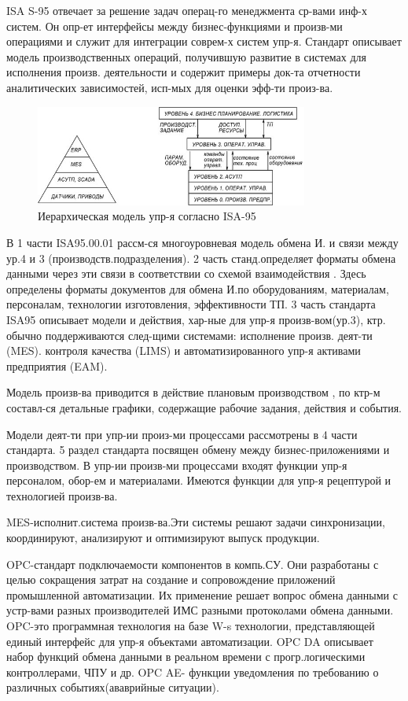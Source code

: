 \documentclass[unicode, 12pt, a4paper, oneside]{article}
\begin{document}
ISA S-95 отвечает за решение задач операц-го менеджмента ср-вами инф-х систем. Он опр-ет интерфейсы между бизнес-функциями и произв-ми операциями и служит для интеграции соврем-х систем упр-я. Стандарт описывает модель производственных операций, получившую развитие в системах для исполнения произв. деятельности и содержит примеры док-та отчетности аналитических зависимостей, исп-мых для оценки эфф-ти произ-ва.
\begin{figure}[H]
\centering
\includegraphics[width=0.8\textwidth]{47_Urovni.jpg}
\caption{Иерархическая модель упр-я согласно ISA-95}
\end{figure}

В 1 части ISA95.00.01 рассм-ся многоуровневая модель обмена И. и связи между ур.4 и 3 (производств.подразделения). 2 часть станд.определяет форматы обмена данными через эти связи в соответствии со схемой взаимодействия . Здесь определены форматы документов для обмена И.по оборудованиям, материалам, персоналам, технологии изготовления, эффективности ТП. 3 часть стандарта ISA95 описывает модели и действия, хар-ные для упр-я произв-вом(ур.3), ктр. обычно поддерживаются след-щими системами: исполнение произв. деят-ти (MES). контроля качества (LIMS) и автоматизированного упр-я активами предприятия (EAM).

Модель произв-ва приводится в действие плановым производством , по ктр-м составл-ся детальные графики, содержащие рабочие задания, действия и события.

Модели деят-ти при упр-ии произ-ми процессами рассмотрены в 4 части стандарта. 5 раздел стандарта посвящен обмену между бизнес-приложениями и производством. В упр-ии произв-ми процессами входят функции упр-я персоналом, обор-ем и материалами. Имеются функции для упр-я рецептурой и технологией произв-ва.

MES-исполнит.система произв-ва.Эти системы решают задачи синхронизации, координируют, анализируют и оптимизируют выпуск продукции.

OPC-стандарт подключаемости компонентов в компь.СУ. Они разработаны с целью сокращения затрат на создание и сопровождение приложений промышленной автоматизации. Их применение решает вопрос обмена данными с устр-вами разных производителей ИМС разными протоколами обмена данными. OPC-это программная технология на базе W-s технологии, представляющей единый интерфейс для упр-я объектами автоматизации. OPC DA описывает набор функций обмена данными в реальном времени с прогр.логическими контроллерами, ЧПУ и др. OPC AE- функции уведомления по требованию о различных событиях(ававрийные ситуации).
\end{document}
